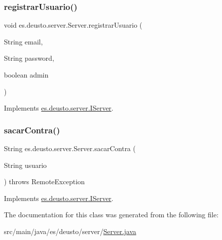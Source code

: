 \subsubsection{\texorpdfstring{registrarUsuario()}{registrarUsuario()}}
{\footnotesize\ttfamily void es.\+deusto.\+server.\+Server.\+registrar\+Usuario (\begin{DoxyParamCaption}\item[{String}]{email,  }\item[{String}]{password,  }\item[{boolean}]{admin }\end{DoxyParamCaption})}



Implements \mbox{\hyperlink{interfacees_1_1deusto_1_1server_1_1_i_server_af6743c655c7831fa6d87e6e910bb6db4}{es.\+deusto.\+server.\+I\+Server}}.

\mbox{\label{classes_1_1deusto_1_1server_1_1_server_aefe051d880626950ea2964d89a4ae3c3}} 
\subsubsection{\texorpdfstring{sacarContra()}{sacarContra()}}
{\footnotesize\ttfamily String es.\+deusto.\+server.\+Server.\+sacar\+Contra (\begin{DoxyParamCaption}\item[{String}]{usuario }\end{DoxyParamCaption}) throws Remote\+Exception}



Implements \mbox{\hyperlink{interfacees_1_1deusto_1_1server_1_1_i_server_a950b819a4f67edf0ef76221dd4714d47}{es.\+deusto.\+server.\+I\+Server}}.



The documentation for this class was generated from the following file\+:\begin{DoxyCompactItemize}
\item 
src/main/java/es/deusto/server/\mbox{\hyperlink{_server_8java}{Server.\+java}}\end{DoxyCompactItemize}

